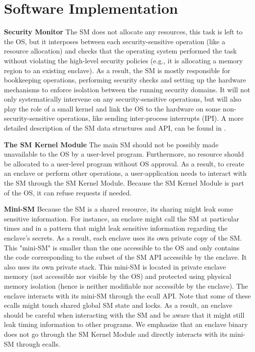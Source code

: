 
\section{Software Implementation}
\label{sec:softwareinfrastructure}
\label{sec:softwarecomponents}

\textbf{Security Monitor}
The SM does not allocate any resources, this task is left to the OS, but it interposes between each security-sensitive operation (like a resource allocation) and checks that the operating system performed the task without violating the high-level security policies (e.g., it is allocating a memory region to an existing enclave).
As a result, the SM is mostly responsible for bookkeeping operations, performing security checks and setting up the hardware mechanisms to enforce isolation between the running security domains.
It will not only systematically intervene on any security-sensitive operations, but will also play the role of a small kernel and link the OS to the hardware on some non-security-sensitive operations, like sending inter-process interrupts (IPI).
A more detailed description of the SM data structures and API, can be found in \cite{lebedev2019sanctorum}.

\textbf{The SM Kernel Module}
The main SM should not be possibly made unavailable to the OS by a user-level program.
Furthermore, no resource should be allocated to a user-level program without OS approval.
As a result, to create an enclave or perform other operations,
a user-application needs to interact with the SM through the SM Kernel Module.
Because the SM Kernel Module is part of the OS, it can refuse requests if needed.

\textbf{Mini-SM}
Because the SM is a shared resource, its sharing might leak some sensitive information. For instance, an enclave might call the SM at particular times and in a pattern that might leak sensitive information regarding the enclave's secrets.
As a result, each enclave uses its own private copy of the SM.
This "mini-SM" is smaller than the one accessible to the OS and only contains the code corresponding to the subset of the SM API accessible by the enclave.
It also uses its own private stack.
This mini-SM is located in private enclave memory (not accessible nor visible by the OS) and protected using physical memory isolation (hence is neither modifiable nor accessible by the enclave).
The enclave interacts with its mini-SM through the ecall API.
Note that some of these ecalls might touch shared global SM state and locks.
As a result, an enclave should be careful when interacting with the SM and be aware that it might still leak timing information to other programs.
We emphasize that an enclave binary does not go through the SM Kernel Module and directly interacts with its mini-SM through ecalls.

